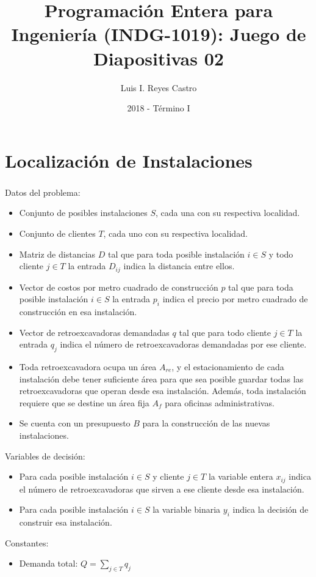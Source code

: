 \documentclass[ 10pt, xcolor = dvipsnames]{beamer}
\title[\shorttitle]{Programaci\'on Entera para Ingenier\'ia (INDG-1019): \textbf{Juego de Diapositivas 02} }
\author[L. I. Reyes Castro]{Luis I. Reyes Castro}
\institute[ESPOL]{\normalsize Escuela Superior Polit\'ecnica del Litoral (ESPOL) \\ Guayaquil - Ecuador}
\date[2018-T1]{2018 - T\'ermino I}
\begin{document}




\section{Localizaci\'on de Instalaciones}

\begin{frame}[allowframebreaks]
\frametitle{\insertsection}

Datos del problema: 
\begin{itemize}
\item Conjunto de posibles instalaciones $S$, cada una con su respectiva localidad. 
\item Conjunto de clientes $T$, cada uno con su respectiva localidad. 
\item Matriz de distancias $D$ tal que para toda posible instalaci\'on $i \in S$ y todo cliente $j \in T$ la entrada $D_{ij}$ indica la distancia entre ellos. 
\item Vector de costos por metro cuadrado de construcci\'on $p$ tal que para toda posible instalaci\'on $i \in S$ la entrada $p_i$ indica el precio por metro cuadrado de construcci\'on en esa instalaci\'on. 
\item Vector de retroexcavadoras demandadas $q$ tal que para todo cliente $j \in T$ la entrada $q_j$ indica el n\'umero de retroexcavadoras demandadas por ese cliente. 
\framebreak

\item Toda retroexcavadora ocupa un \'area $A_{re}$, y el estacionamiento de cada instalaci\'on debe tener suficiente \'area para que sea posible guardar todas las retroexcavadoras que operan desde esa instalaci\'on. Adem\'as, toda instalaci\'on requiere que se destine un \'area fija $A_f$ para oficinas administrativas. 
\item Se cuenta con un presupuesto $B$ para la construcci\'on de las nuevas instalaciones. 

\end{itemize}

Variables de decisi\'on: 
\begin{itemize}
\item Para cada posible instalaci\'on $i \in S$ y cliente $j \in T$ la variable entera $x_{ij}$ indica el n\'umero de retroexcavadoras que sirven a ese cliente desde esa instalaci\'on. 
\item Para cada posible instalaci\'on $i \in S$ la variable binaria $y_i$ indica la decisi\'on de construir esa instalaci\'on. 
\end{itemize}

Constantes: 
\begin{itemize}
\item Demanda total: $Q = \sum_{j \in T} q_j$
\end{itemize}

\end{frame}
\end{document}

